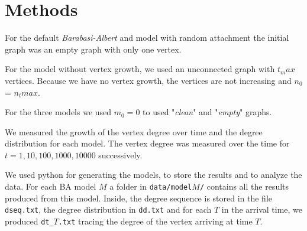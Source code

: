 \documentclass{article}
\begin{document}
\section*{Methods} \label{methods}

For the default \textit{Barabasi-Albert} and model with random attachment the 
initial graph was an empty graph with only one vertex.

For the model without vertex growth, we used an unconnected graph with $t_max$ 
vertices. Because we have no vertex growth, the vertices are not increasing and 
$n_0$ = $n_tmax$.

For the three models we used $m_0 = 0$ to used "\textit{clean}" and 
"\textit{empty}" graphs.

We measured the growth of the vertex degree over time and the degree 
distribution for each model. The vertex degree was measured over the time for $t 
= 1, 10, 100, 1000, 10000$ successively.

We used python for generating the models, to store the results and to analyze 
the data. For each BA model $M$ a folder in \texttt{data/model$M$/} contains all 
the results produced from this model. Inside, the degree sequence is stored in 
the file \texttt{dseq.txt}, the degree distribution in \texttt{dd.txt} and for 
each $T$ in the arrival time, we produced \texttt{dt\_$T$.txt} tracing the 
degree of the vertex arriving at time $T$.
\end{document}
